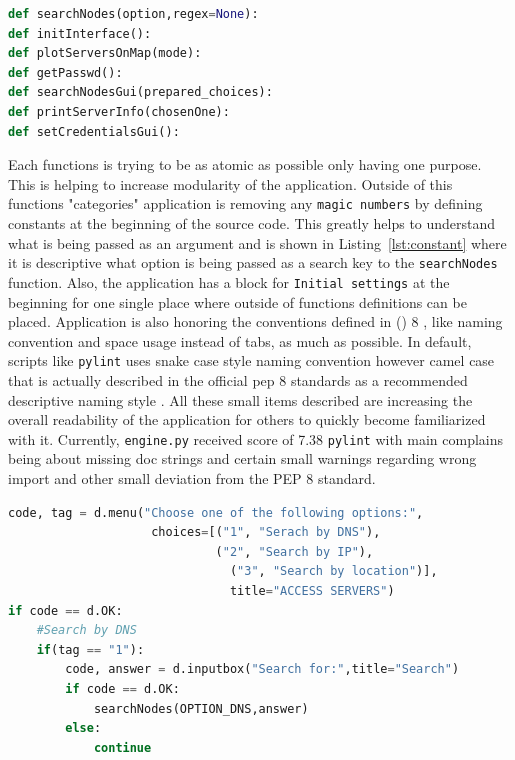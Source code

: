 {{{\noindent\begin{minipage}{\linewidth}
\begin{lstlisting}[language=Python, numbers=none, label={lst:descriptive}, caption=Example of Function Names, frame=single, showstringspaces=false, breaklines=true]
def searchNodes(option,regex=None):
def initInterface():
def plotServersOnMap(mode):
def getPasswd():
def searchNodesGui(prepared_choices):
def printServerInfo(chosenOne):
def setCredentialsGui():
\end{lstlisting}
\end{minipage}

Each functions is trying to be as atomic as possible only having one purpose. This is helping to increase modularity of the application. Outside of this functions "categories" application is removing any \texttt{magic numbers} by defining constants at the beginning of the source code. This greatly helps to understand what is being passed as an argument and is shown in Listing~\ref{lst:constant} where it is descriptive what option is being passed as a search key to the \texttt{searchNodes} function. Also, the application has a block for \texttt{Initial settings} at the beginning for one single place where outside of functions definitions can be placed. Application is also honoring the conventions defined in  () 8 \cite{pythonpep}, like naming convention and space usage instead of tabs, as much as possible. In default, scripts like \texttt{pylint} uses snake case style naming convention however camel case that is actually described in the official pep 8 standards as a recommended descriptive naming style \cite{pythonpep}. All these small items described are increasing the overall readability of the application for others to quickly become familiarized with it. Currently, \texttt{engine.py} received score of 7.38  \texttt{pylint} with main complains being about missing doc strings and certain small warnings regarding wrong import and other small deviation from the PEP 8 standard.

{\noindent\begin{minipage}{\linewidth}
\begin{lstlisting}[language=Python, numbers=none, label={lst:constant}, caption=Example of Constant Usage, frame=single, showstringspaces=false, breaklines=true]
code, tag = d.menu("Choose one of the following options:",
					choices=[("1", "Serach by DNS"),
				      		 ("2", "Search by IP"),
					    	   ("3", "Search by location")],
						       title="ACCESS SERVERS")
if code == d.OK:
	#Search by DNS
	if(tag == "1"):
		code, answer = d.inputbox("Search for:",title="Search")
		if code == d.OK:
			searchNodes(OPTION_DNS,answer)
		else:
			continue
\end{lstlisting}
\end{minipage}

}}}}
